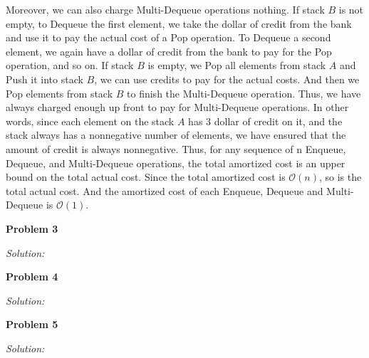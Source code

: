 \documentclass[12pt,letterpaper]{article}
\def\pp{\par\noindent}
\newcommand{\problem}[1]{ \bigskip \pp \textbf{Problem #1}\par}
\newcommand{\solution}{\textit{Solution:}\par}
\begin{document}
Moreover, we can also charge Multi-Dequeue operations nothing. If stack $B$ is not empty, to Dequeue the first element, we take the dollar of credit from the bank and use it to pay the actual cost of a Pop operation. To Dequeue a second element, we again have a dollar of credit from the bank to pay for the Pop operation, and so on. If stack $B$ is empty, we Pop all elements from stack $A$ and Push it into stack $B$, we can use credits to pay for the actual costs. And then we Pop elements from stack $B$ to finish the Multi-Dequeue operation. Thus, we have always charged enough up front to pay for Multi-Dequeue operations. In other words, since each element on the stack $A$ has 3 dollar of credit on it, and the stack always has a nonnegative number of elements, we have ensured that the amount of credit is always nonnegative. Thus, for any sequence of n Enqueue, Dequeue, and Multi-Dequeue operations, the total amortized cost is an upper bound on the total actual cost. Since the total amortized cost is $\mathcal{O}(n)$, so is the total actual cost. And the amortized cost of each Enqueue, Dequeue and Multi-Dequeue is $\mathcal{O}(1)$.

\problem{3}
\solution

\problem{4}
\solution

\problem{5}
\solution
\end{document}
